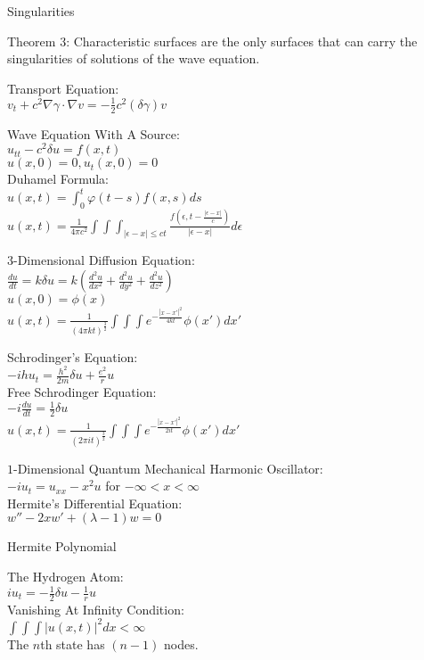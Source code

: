 Singularities

Theorem 3: Characteristic surfaces are the only surfaces that can carry the singularities of solutions of the wave equation.

Transport Equation: \\
$v_t + c^2 \nabla \gamma \cdot \nabla v = -\frac{1}{2} c^2 (\delta \gamma) v$

Wave Equation With A Source: \\
$u_{tt}-c^2 \delta u = f(x,t)$ \\
$u(x,0)=0, u_t (x,0)=0$ \\
Duhamel Formula: \\
$u(x,t)=\int_0^t \varphi (t-s) f(x,s) ds$ \\
$u(x,t)=\frac{1}{4 \pi c^2} \int \int \int_{|\epsilon -x| \le ct} \frac{f(\epsilon, t-\frac{|\epsilon - x|}{c})}{|\epsilon - x|} d \epsilon$

$3$-Dimensional Diffusion Equation: \\
$\frac{du}{dt} = k \delta u = k \left(\frac{d^2 u}{dx^2}+\frac{d^2 u}{dy^2}+\frac{d^2 u}{dz^2} \right)$ \\
$u(x,0)=\phi (x)$ \\
$u(x,t) = \frac{1}{(4 \pi kt)^{\frac{3}{2}}} \int \int \int e^{-\frac{|x-x'|^2}{4kt}} \phi (x') dx'$

Schrodinger's Equation: \\
$-ihu_t = \frac{h^2}{2m} \delta u + \frac{e^2}{r} u$ \\

Free Schrodinger Equation: \\
$-i \frac{du}{dt} = \frac{1}{2} \delta u$ \\
$u(x,t)=\frac{1}{(2 \pi it)^{\frac{3}{2}}} \int \int \int e^{-\frac{|x-x'|^2}{2it}} \phi (x') dx'$

$1$-Dimensional Quantum Mechanical Harmonic Oscillator: \\
$-iu_t=u_{xx}-x^2u$ for $ -\infty < x < \infty$ \\
Hermite's Differential Equation: \\
$w''-2xw'+(\lambda -1)w=0$

Hermite Polynomial

The Hydrogen Atom: \\
$iu_t = -\frac{1}{2} \delta u-\frac{1}{r} u$ \\
Vanishing At Infinity Condition: \\
$\int \int \int |u(x,t)|^2 dx < \infty$ \\
The $n$th state has $(n-1)$ nodes.


